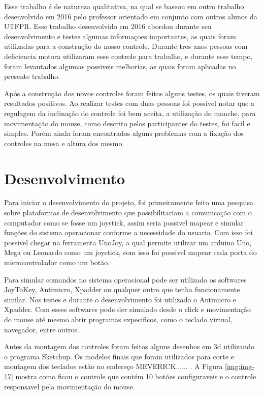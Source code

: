 \documentclass[
	12pt,			%
	openright,		%
	oneside,			%
	a4paper,			%
	chapter=TITLE,		%
	english,			%
	brazil,			%
	]{abntex2}
\begin{document}
Esse trabalho é de natureza qualitativa, na qual se baseou em outro trabalho desenvolvido em 2016 pelo professor orientado em conjunto com outros alunos da UTFPR. Esse trabalho desenvolvido em 2016 abordou durante seu desenvolvimento e testes algumas informaçoes importantes, as quais foram utilizadas para a construção do nosso controle. Durante tres anos pessoas com deficiencia motora utilizaram esse controle para trabalho, e durante esse tempo, foram levantados algumas possiveis melhorias, as quais foram aplicadas no presente trabalho. 

Após a construção dos novos controles foram feitos alguns testes, os quais tiveram resultados positivos. Ao realizar testes com duas pessoas foi possivel notar que a regulagem da inclinação do controle foi bem aceita, a utilização do manche, para movimentação do mouse, como descrito pelos participantes do testes, foi facil e simples. Porém ainda foram encontrados alguns problemas com a fixação dos controles na mesa e altura dos mesmo.

\chapter{Desenvolvimento}
\label{des}

Para iniciar o desenvolvimento do projeto, foi primeiramente feito uma pesquisa sobre plataformas de desenvolvimento que possibilitariam a comunicação com o computador como se fosse um joystick, assim seria possivel mapear e simular funções do sistema operacionar conforme a necessidade do usuario. Com isso foi possivel chegar na ferramenta UnoJoy, a qual permite utilizar um arduino Uno, Mega ou Leonardo como um joystick, com isso foi possivel mapear cada porta do microcontrolador como um botão.

Para simular comandos no sistema operacional pode ser utilizado os softwares JoyToKey, Antimicro, Xpadder ou qualquer outro que tenha funcionamente similar. Nos testes e durante o desenvolvimento foi utilizado o Antimicro e Xpadder. Com esses softwares pode der simulado desde o click e movimentação do mouse até mesmo abrir programas expecificos, como o teclado virtual, navegador, entre outros.

Antes da montagem dos controles foram feitos alguns desenhos em 3d utilizando o programa Sketchup. Os modelos finais que foram utilizados para corte e montagem dos teclados estão no endereço MEVERICK...... . A Figura \ref{img:img-17} mostra como ficou o controle que contém 10 botões configuraveis e o controle responsavel pela movimentação do mouse.
\end{document}
